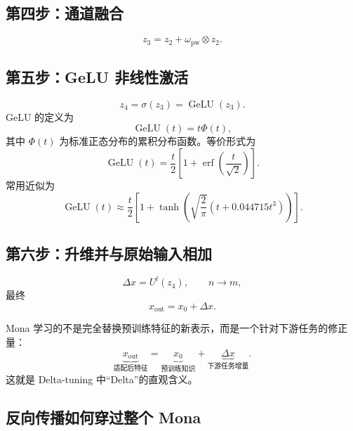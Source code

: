 \documentclass[UTF8,12pt,a4paper,fontset=none]{ctexart}
\newcommand{\GeLU}{\operatorname{GeLU}}
\begin{document}
\subsection{第四步：通道融合}
\begin{equation}
 z_3=z_2+\omega_{\mathrm{pw}}\otimes z_2.
\end{equation}

\subsection{第五步：GeLU 非线性激活}
\begin{equation}
 z_4=\sigma(z_3)=\GeLU(z_3).
\end{equation}
GeLU 的定义为
\begin{equation}
 \GeLU(t)=t\Phi(t),
\end{equation}
其中 $\Phi(t)$ 为标准正态分布的累积分布函数。等价形式为
\begin{equation}
 \GeLU(t)
 =\frac{t}{2}\left[1+\operatorname{erf}\left(\frac{t}{\sqrt{2}}\right)\right].
\end{equation}
常用近似为
\begin{equation}
 \GeLU(t)\approx
 \frac{t}{2}\left[
 1+\tanh\left(
 \sqrt{\frac{2}{\pi}}
 \left(t+0.044715t^3\right)
 \right)
 \right].
\end{equation}

\subsection{第六步：升维并与原始输入相加}
\begin{equation}
 \Delta x=U^l(z_4),\qquad n\to m,
\end{equation}
最终
\begin{equation}
 x_{\mathrm{out}}=x_0+\Delta x.
\end{equation}

\begin{keybox}
Mona 学习的不是完全替换预训练特征的新表示，而是一个针对下游任务的修正量：
\begin{equation*}
\underbrace{x_{\mathrm{out}}}_{\text{适配后特征}}
=
\underbrace{x_0}_{\text{预训练知识}}
+
\underbrace{\Delta x}_{\text{下游任务增量}}.
\end{equation*}
这就是 Delta-tuning 中“Delta”的直观含义。
\end{keybox}



\subsection{反向传播如何穿过整个 Mona}
\end{document}

